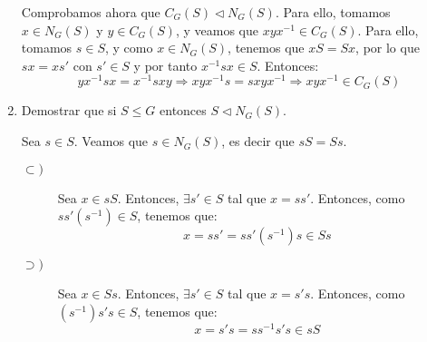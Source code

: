 \begin{ejercicio}
\begin{enumerate}
        \begin{comment}
        Comprobamos ahora las tres condiciones para ser subgrupo:
        \begin{itemize}
            \item $1\in C_G(S)$, ya que $1s=s=s1$.
            \item Sea $x,y\in C_G(S)$. Entonces $xs=sx$ y $ys=sy$ para todo $s\in S$. Entonces:
                \begin{align*}
                    (xy)s &= x(ys) = x(sy) = (xs)y = (sx)y = s(xy)
                \end{align*}
                Por tanto, es cerrado para el producto.
            \item Sea $x\in C_G(S)$, $xs=sx$. Entonces:
                \begin{align*}
                    xs &= sx \Longrightarrow s = x^{-1}sx \Longrightarrow sx^{-1} = x^{-1}s \Longrightarrow x^{-1}\in C_G(S)
                \end{align*}
                Por tanto, es cerrado para inversos.
        \end{itemize}
        \end{comment}

        Comprobamos ahora que $C_G(S)\lhd N_G(S)$. Para ello, tomamos $x\in N_G(S)$ y $y\in C_G(S)$, y veamos que $xyx^{-1}\in C_G(S)$. Para ello, tomamos $s\in S$, y como $x\in N_G(S)$, tenemos que $xS=Sx$, por lo que $sx = xs'$ con $s'\in S$ y por tanto $x^{-1}sx \in S$. Entonces:
        \begin{equation*}
            yx^{-1}sx = x^{-1}sxy
            \Longrightarrow xyx^{-1}s = sxyx^{-1}
            \Longrightarrow xyx^{-1}\in C_G(S)
        \end{equation*}
        \item Demostrar que si $S\leq G$ entonces $S\lhd N_G(S)$.
        
        Sea $s\in S$. Veamos que $s\in N_G(S)$, es decir que $sS=Ss$.
        \begin{description}
            \item[$\subset)$] Sea $x\in sS$. Entonces, $\exists s'\in S$ tal que $x=ss'$. Entonces, como $ss'(s^{-1})\in S$, tenemos que:
            \begin{equation*}
                x=ss'=ss'(s^{-1})s\in Ss
            \end{equation*}

            \item[$\supset)$] Sea $x\in Ss$. Entonces, $\exists s'\in S$ tal que $x=s's$. Entonces, como $(s^{-1})s's\in S$, tenemos que:
            \begin{equation*}
                x=s's=ss^{-1}s's\in sS
            \end{equation*}
        \end{description}


\end{enumerate}
\end{ejercicio}
